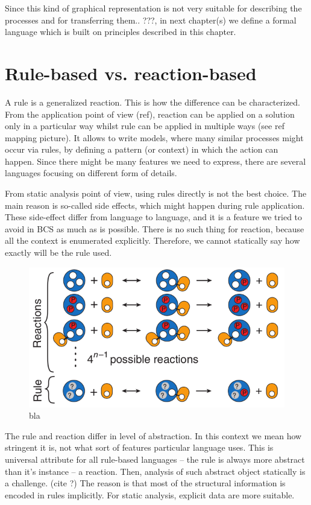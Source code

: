 \documentclass[12pt]{fithesis2}
\begin{document}
Since this kind of graphical representation is not very suitable for describing the processes and for transferring them.. ???, in next chapter(s) we define a formal language which is built on principles described in this chapter.

\section{Rule-based vs. reaction-based}

A rule is a generalized reaction. This is how the difference can be characterized. From the application point of view (ref), reaction can be applied on a solution only in a particular way whilst rule can be applied in multiple ways (see ref mapping picture). It allows to write models, where many similar processes might occur via rules, by defining a pattern (or context) in which the action can happen. Since there might be many features we need to express, there are several languages focusing on different form of details.  

From static analysis point of view, using rules directly is not the best choice. The main reason is so-called side effects, which might happen during rule application. These side-effect differ from language to language, and it is a feature we tried to avoid in BCS as much as is possible. There is no such thing for reaction, because all the context is enumerated explicitly. Therefore, we cannot statically say how exactly will be the rule used.

\begin{figure}
\begin{center}
\includegraphics[scale=0.5]{pics/reaction_vs_rule}
\end{center}
\caption{bla}
\end{figure}

The rule and reaction differ in level of abstraction. In this context we mean how stringent it is, not what sort of features particular language uses. This is universal attribute for all rule-based languages -- the rule is always more abstract than it's instance -- a reaction. Then, analysis of such abstract object statically is a challenge. (cite ?) The reason is that most of the structural information is encoded in rules implicitly. For static analysis, explicit data are more suitable.
\end{document}
